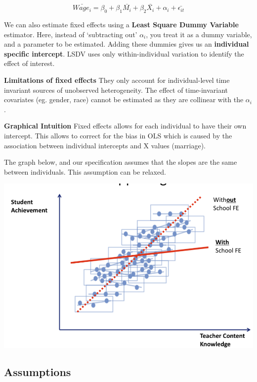 \documentclass[12 pt, leqno]{article}
\begin{document}
$$\bar{Wage_i} = \beta_0 + \beta_1 \bar{M_i} + \beta_2 \bar{X_i} + \alpha_i + \bar{\epsilon_{it}}$$

We can also estimate fixed effects using a \textbf{Least Square Dummy Variable} estimator. Here, instead of `subtracting out' $\alpha_i$, you treat it as a dummy variable, and a parameter to be estimated. Adding these dummies gives us an \textbf{individual specific intercept}. LSDV uses only within-individual variation to identify the effect of interest.

\textbf{Limitations of fixed effects} They only account for individual-level time invariant sources of unobserved heterogeneity. The effect of time-invariant covariates (eg. gender, race) cannot be estimated as they are collinear with the $\alpha_i$. 

\textbf{Graphical Intuition} Fixed effects allows for each individual to have their own intercept. This allows to correct for the bias in OLS which is caused by the association between individual intercepts and X values (marriage). 

The graph below, and our specification assumes that the slopes are the same between individuals. This assumption can be relaxed.

\begin{center}
\includegraphics[width = \textwidth]{fixed_effects}
\end{center}

\subsection{Assumptions}
\end{document}
